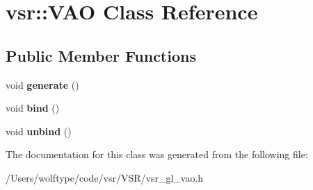 \hypertarget{classvsr_1_1_v_a_o}{\section{vsr\-:\-:V\-A\-O Class Reference}
\label{classvsr_1_1_v_a_o}
}
\subsection*{Public Member Functions}
\begin{DoxyCompactItemize}
\item 
\hypertarget{classvsr_1_1_v_a_o_a098d8615d2b8d607efc99c7afd50305a}{void {\bfseries generate} ()}\label{classvsr_1_1_v_a_o_a098d8615d2b8d607efc99c7afd50305a}

\item 
\hypertarget{classvsr_1_1_v_a_o_a69870550a0953fc7ee50ea41e7dacb00}{void {\bfseries bind} ()}\label{classvsr_1_1_v_a_o_a69870550a0953fc7ee50ea41e7dacb00}

\item 
\hypertarget{classvsr_1_1_v_a_o_a7fb9e8f72e4cd7632e35988437d5e79b}{void {\bfseries unbind} ()}\label{classvsr_1_1_v_a_o_a7fb9e8f72e4cd7632e35988437d5e79b}

\end{DoxyCompactItemize}


The documentation for this class was generated from the following file\-:\begin{DoxyCompactItemize}
\item 
/\-Users/wolftype/code/vsr/\-V\-S\-R/vsr\-\_\-gl\-\_\-vao.\-h\end{DoxyCompactItemize}

